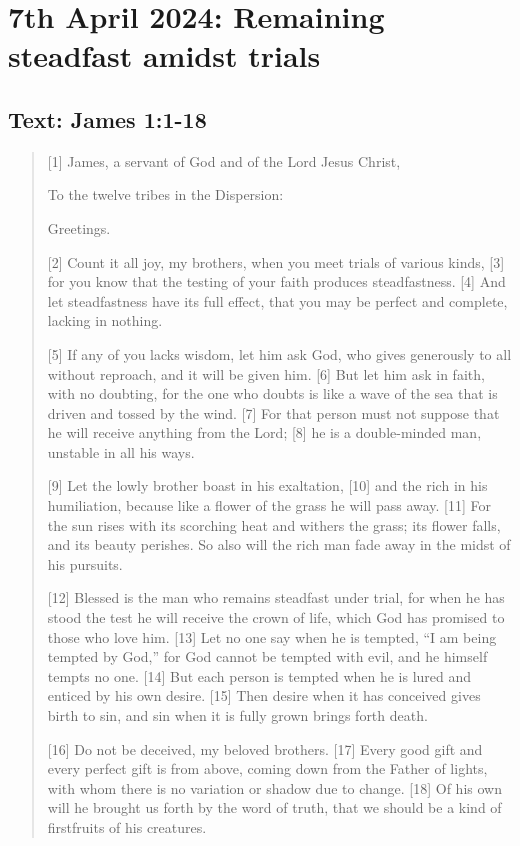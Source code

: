 \setcounter{figure}{0}

\section{7th April 2024: Remaining steadfast amidst trials}
\subsection*{Text: James 1:1-18}
  \begin{quote}
    [1] James, a servant of God and of the Lord Jesus Christ,

    To the twelve tribes in the Dispersion:

    Greetings.

    [2] Count it all joy, my brothers, when you meet trials of various kinds, [3] for you know that the testing of your faith produces steadfastness. [4] And let steadfastness have its full effect, that you may be perfect and complete, lacking in nothing.

    [5] If any of you lacks wisdom, let him ask God, who gives generously to all without reproach, and it will be given him. [6] But let him ask in faith, with no doubting, for the one who doubts is like a wave of the sea that is driven and tossed by the wind. [7] For that person must not suppose that he will receive anything from the Lord; [8] he is a double-minded man, unstable in all his ways.

    [9] Let the lowly brother boast in his exaltation, [10] and the rich in his humiliation, because like a flower of the grass he will pass away. [11] For the sun rises with its scorching heat and withers the grass; its flower falls, and its beauty perishes. So also will the rich man fade away in the midst of his pursuits.

    [12] Blessed is the man who remains steadfast under trial, for when he has stood the test he will receive the crown of life, which God has promised to those who love him. [13] Let no one say when he is tempted, “I am being tempted by God,” for God cannot be tempted with evil, and he himself tempts no one. [14] But each person is tempted when he is lured and enticed by his own desire. [15] Then desire when it has conceived gives birth to sin, and sin when it is fully grown brings forth death.

    [16] Do not be deceived, my beloved brothers. [17] Every good gift and every perfect gift is from above, coming down from the Father of lights, with whom there is no variation or shadow due to change. [18] Of his own will he brought us forth by the word of truth, that we should be a kind of firstfruits of his creatures.
  \end{quote}
